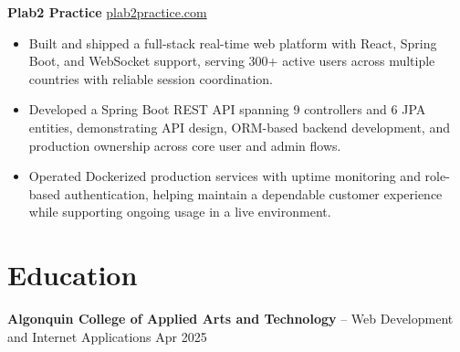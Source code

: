 \documentclass[11pt]{article}       %
\begin{document}
\textbf{Plab2 Practice} \hfill \href{https://plab2practice.com}{plab2practice.com} \\
\vspace{-9pt}
\begin{itemize}
  \item Built and shipped a full-stack real-time web platform with React, Spring Boot, and WebSocket support, serving 300+ active users across multiple countries with reliable session coordination.
  \item Developed a Spring Boot REST API spanning 9 controllers and 6 JPA entities, demonstrating API design, ORM-based backend development, and production ownership across core user and admin flows.
  \item Operated Dockerized production services with uptime monitoring and role-based authentication, helping maintain a dependable customer experience while supporting ongoing usage in a live environment.
\end{itemize}





\section*{Education}
\textbf{Algonquin College of Applied Arts and Technology} -- Web Development and Internet Applications
\hfill Apr 2025 \\
\end{document}
